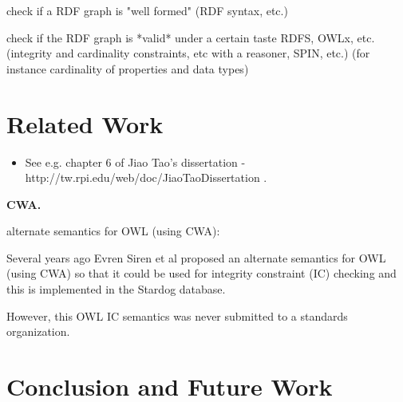 \documentclass{llncs}
\begin{document}
check if a RDF graph is "well formed" (RDF syntax, etc.)

check if the RDF graph is *valid* under a certain taste RDFS, OWLx, etc. (integrity and cardinality constraints, etc with a reasoner, SPIN, etc.) (for instance cardinality of properties and data types)

\section{Related Work}

\begin{itemize}
	\item See e.g. chapter 6 of Jiao Tao's dissertation - http://tw.rpi.edu/web/doc/JiaoTaoDissertation .
\end{itemize}

\textbf{CWA.}

alternate semantics for OWL (using CWA):

Several years ago Evren Siren et al proposed an alternate semantics for OWL (using CWA) so that it could be used for integrity constraint (IC) checking and this is implemented in the Stardog database. 

However, this OWL IC semantics was never submitted to a standards organization.

\section{Conclusion and Future Work}



{}

\setcounter{tocdepth}{1}
\end{document}
